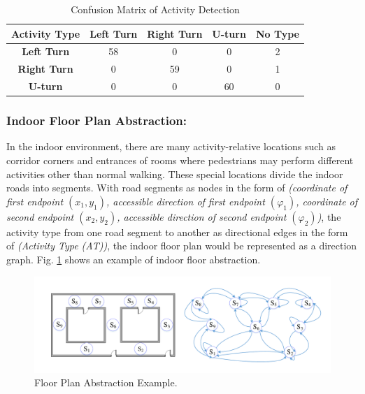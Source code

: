 \documentclass{llncs}
\begin{document}
\vspace{-10pt}
\begin{table}
	\label{table_conf}
	\caption{Confusion Matrix of Activity Detection}
	\begin{center}
		\begin{tabular}{| c || c | c | c | c |}
			\hline
			\bfseries Activity Type & \bfseries Left Turn & \bfseries Right Turn & \bfseries U-turn & \bfseries No Type\\
			\hline\hline
			\bfseries Left Turn & 58 & 0 & 0 & 2 \\
			\hline
			\bfseries Right Turn & 0 & 59 & 0 & 1 \\
			\hline
			\bfseries U-turn & 0 & 0 & 60 & 0 \\
			\hline
		\end{tabular}
	\end{center}
\end{table}
\vspace{-30pt}

\subsubsection{Indoor Floor Plan Abstraction:}

In the indoor environment, there are many activity-relative locations such as corridor corners and entrances of rooms where pedestrians may perform different activities other than normal walking. These special locations divide the indoor roads into segments. With road segments as nodes in the form of \emph{(coordinate of first endpoint $(x_1,y_1)$, accessible direction of first endpoint $({\varphi}_1)$, coordinate of second endpoint $(x_2,y_2)$, accessible direction of second endpoint $({\varphi}_2)$)}, the activity type from one road segment to another as directional edges in the form of \emph{(Activity Type (AT))}, the indoor floor plan would be represented as a direction graph. Fig. \ref{fig-abstract} shows an example of indoor floor abstraction. 

\vspace{-10pt}
\begin{figure}[!htbp]
	\centering
	\includegraphics[width=4.576in]{AiFiMatch-MapAbstract}
	\caption{Floor Plan Abstraction Example.}
	\label{fig-abstract}
\end{figure}
\vspace{-20pt}
\end{document}
